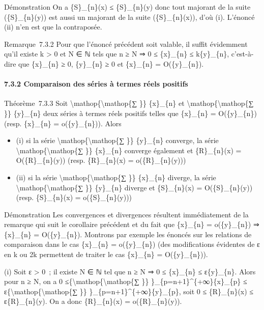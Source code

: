 \documentclass[]{article}
\begin{document}
Démonstration On a \{S\}\_\{n\}(x) ≤ \{S\}\_\{n\}(y) donc tout majorant
de la suite (\{S\}\_\{n\}(y)) est aussi un majorant de la suite
(\{S\}\_\{n\}(x)), d'où (i). L'énoncé (ii) n'en est que la contraposée.

Remarque~7.3.2 Pour que l'énoncé précédent soit valable, il suffit
évidemment qu'il existe k \textgreater{} 0 et N ∈ ℕ tels que n ≥ N ⇒ 0 ≤
\{x\}\_\{n\} ≤ k\{y\}\_\{n\}, c'est-à-dire que \{x\}\_\{n\} ≥ 0,
\{y\}\_\{n\} ≥ 0 et \{x\}\_\{n\} = O(\{y\}\_\{n\}).

\paragraph{7.3.2 Comparaison des séries à termes réels positifs}

Théorème~7.3.3 Soit \textbackslash{}mathop\{\textbackslash{}mathop\{∑
\}\} \{x\}\_\{n\} et \textbackslash{}mathop\{\textbackslash{}mathop\{∑
\}\} \{y\}\_\{n\} deux séries à termes réels positifs telles que
\{x\}\_\{n\} = O(\{y\}\_\{n\}) (resp. \{x\}\_\{n\} = o(\{y\}\_\{n\})).
Alors

\begin{itemize}
\itemsep1pt\parskip0pt
\item
  (i) si la série \textbackslash{}mathop\{\textbackslash{}mathop\{∑ \}\}
  \{y\}\_\{n\} converge, la série
  \textbackslash{}mathop\{\textbackslash{}mathop\{∑ \}\} \{x\}\_\{n\}
  converge également et \{R\}\_\{n\}(x) = O(\{R\}\_\{n\}(y)) (resp.
  \{R\}\_\{n\}(x) = o(\{R\}\_\{n\}(y)))
\item
  (ii) si la série \textbackslash{}mathop\{\textbackslash{}mathop\{∑
  \}\} \{x\}\_\{n\} diverge, la série
  \textbackslash{}mathop\{\textbackslash{}mathop\{∑ \}\} \{y\}\_\{n\}
  diverge et \{S\}\_\{n\}(x) = O(\{S\}\_\{n\}(y)) (resp. \{S\}\_\{n\}(x)
  = o(\{S\}\_\{n\}(y)))
\end{itemize}

Démonstration Les convergences et divergences résultent immédiatement de
la remarque qui suit le corollaire précédent et du fait que \{x\}\_\{n\}
= o(\{y\}\_\{n\}) ⇒ \{x\}\_\{n\} = O(\{y\}\_\{n\}). Montrons par exemple
les énoncés sur les relations de comparaison dans le cas \{x\}\_\{n\} =
o(\{y\}\_\{n\}) (des modifications évidentes de ε en k ou 2k permettent
de traiter le cas \{x\}\_\{n\} = O(\{y\}\_\{n\})).

(i) Soit ε \textgreater{} 0~; il existe N ∈ ℕ tel que n ≥ N ⇒ 0 ≤
\{x\}\_\{n\} ≤ ε\{y\}\_\{n\}. Alors pour n ≥ N, on a 0
≤\{\textbackslash{}mathop\{\textbackslash{}mathop\{∑ \}\}
\}\_\{p=n+1\}\^{}\{+∞\}\{x\}\_\{p\} ≤
ε\{\textbackslash{}mathop\{\textbackslash{}mathop\{∑ \}\}
\}\_\{p=n+1\}\^{}\{+∞\}\{y\}\_\{p\}, soit 0 ≤ \{R\}\_\{n\}(x) ≤
ε\{R\}\_\{n\}(y). On a donc \{R\}\_\{n\}(x) = o(\{R\}\_\{n\}(y)).
\end{document}

